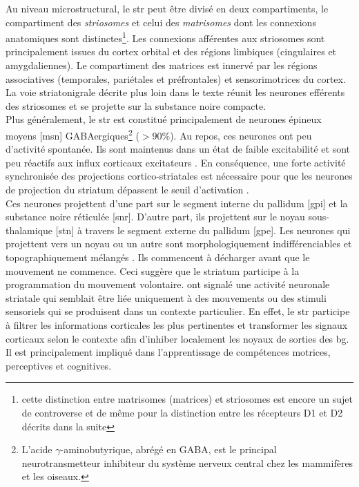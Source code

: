 Au niveau microstructural, le \gls{str} peut être divisé en deux compartiments, le compartiment des \textit{striosomes} et celui des \textit{matrisomes} dont les connexions anatomiques sont distinctes\footnote{cette distinction entre matrisomes (matrices) et striosomes est encore un sujet de controverse et de même pour la distinction entre les récepteurs D1 et D2 décrits dans la suite}. Les connexions afférentes aux striosomes sont principalement issues du cortex orbital et des
régions limbiques (cingulaires et amygdaliennes). Le compartiment des matrices est innervé par les régions associatives (temporales, pariétales et préfrontales) et sensorimotrices du cortex. La voie striatonigrale décrite plus loin dans le texte réunit les neurones efférents des striosomes et se projette sur la substance noire compacte.\\

Plus généralement, le \gls{str} est constitué principalement de neurones épineux moyens [\gls{msn}] GABAergiques\footnote{L'acide $\gamma$-aminobutyrique, abrégé en GABA, est le principal neurotransmetteur inhibiteur du système nerveux central chez les mammifères et les oiseaux.} ($>90\%$). Au repos, ces neurones ont peu d'activité spontanée. Ils sont maintenus dans un état de faible excitabilité et sont peu réactifs aux influx corticaux excitateurs \cite{Nisenbaum:1995}. En conséquence, une forte activité synchronisée des projections cortico-striatales est nécessaire pour que les neurones de projection du striatum dépassent le seuil d'activation \cite {Mahon:2001, Mahon:2003}.\\

Ces neurones projettent d'une part sur le segment interne du pallidum [\gls{gpi}] et la substance noire réticulée [\gls{snr}]. D'autre part, ils projettent sur le noyau sous-thalamique [\gls{stn}] à travers le segment externe du pallidum [\gls{gpe}]. Les neurones qui projettent vers un noyau ou un autre sont morphologiquement indifférenciables et topographiquement mélangés  \cite {Feger:1984, Gerfen:1988, Parent:1989}. Ils commencent à décharger avant que le mouvement ne commence. Ceci suggère que le striatum participe à la programmation du mouvement volontaire. \cite{Lidsky:1985} ont signalé une activité neuronale striatale qui semblait être liée uniquement à des mouvements ou des stimuli sensoriels qui se produisent dans un contexte particulier. En effet, le \gls{str} participe à filtrer les informations corticales les plus pertinentes et transformer les signaux corticaux selon le contexte afin d'inhiber localement les noyaux de sorties des \gls{bg}. Il est principalement impliqué dans l'apprentissage de compétences motrices, perceptives et cognitives\cite{Joel:1994, Suzuki:2001}. \\

